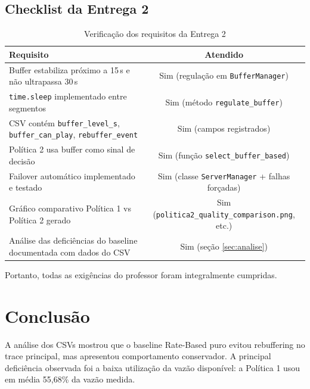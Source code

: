 \documentclass[
    12pt,
    a4paper,
    oneside
]{article}
\begin{document}
\subsection*{Checklist da Entrega 2}

\begin{table}[H]
\centering
\small
\caption{Verificação dos requisitos da Entrega 2}
\label{tab:checklist}
\begin{tabularx}{\linewidth}{|X|c|}
\hline
\textbf{Requisito} & \textbf{Atendido} \\ \hline
Buffer estabiliza próximo a 15\,s e não ultrapassa 30\,s & Sim (regulação em \texttt{BufferManager}) \\ \hline
\texttt{time.sleep} implementado entre segmentos & Sim (método \texttt{regulate\_buffer}) \\ \hline
CSV contém \texttt{buffer\_level\_s}, \texttt{buffer\_can\_play}, \texttt{rebuffer\_event} & Sim (campos registrados) \\ \hline
Política 2 usa buffer como sinal de decisão & Sim (função \texttt{select\_buffer\_based}) \\ \hline
Failover automático implementado e testado & Sim (classe \texttt{ServerManager} + falhas forçadas) \\ \hline
Gráfico comparativo Política 1 vs Política 2 gerado & Sim (\texttt{politica2\_quality\_comparison.png}, etc.) \\ \hline
Análise das deficiências do baseline documentada com dados do CSV & Sim (seção \ref{sec:analise}) \\ \hline
\end{tabularx}
\end{table}

Portanto, todas as exigências do professor foram integralmente cumpridas.

\endgroup


\section{Conclusão}

A análise dos CSVs mostrou que o baseline Rate-Based puro evitou rebuffering no trace principal, mas apresentou comportamento conservador. A principal deficiência observada foi a baixa utilização da vazão disponível: a Política 1 usou em média 55,68\% da vazão medida.
\end{document}
